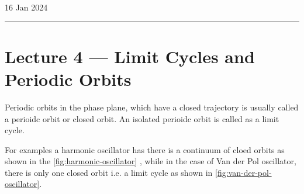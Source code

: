 \hfill\small{16 Jan 2024}
\vspace{0.5em}
\hrule
\vspace{-0.5em}
\section{Lecture 4 --- Limit Cycles and Periodic Orbits}

Periodic orbits in the phase plane, which have a closed trajectory is usually 
called a perioidc orbit or closed orbit. An isolated perioidc orbit is called as a limit cycle.

For examples a harmonic oscillator has there is a continuum of cloed orbits as 
shown in the \autoref{fig:harmonic-oscillator}
, while in the case 
of Van der Pol oscillator, there is only one closed orbit i.e. a limit cycle as shown in
\autoref{fig:van-der-pol-oscillator}.

